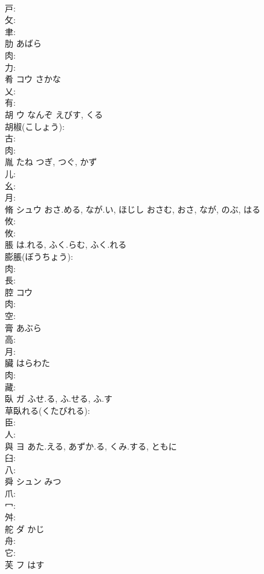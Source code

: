 \documentclass[8pt]{extreport}
\begin{document}
\begin{CJK}{UTF8}{min}
\\	戸: 
\\	攵: 
\\	聿: 
\\	肋		あばら			
\\	肉: 
\\	力: 
\\	肴	コウ	さかな		
\\	乂: 
\\	有: 
\\	胡	ウ	なんぞ	えびす, くる	
\\	胡椒(こしょう): 
\\	古: 
\\	肉: 
\\	胤		たね	つぎ, つぐ, かず		
\\	儿: 
\\	幺: 
\\	月: 
\\	脩	シュウ	おさ.める, なが.い, ほじし	おさむ, おさ, なが, のぶ, はる	
\\	攸: 
\\	攸: 
\\	脹		は.れる, ふく.らむ, ふく.れる			
\\	膨脹(ぼうちょう): 
\\	肉: 
\\	長: 
\\	腔	コウ			
\\	肉: 
\\	空: 
\\	膏		あぶら			
\\	高: 
\\	月: 
\\	臟		はらわた				
\\	肉: 
\\	藏: 
\\	臥	ガ	ふせ.る, ふ.せる, ふ.す		
\\	草臥れる(くたびれる): 
\\	臣: 
\\	人: 
\\	與	ヨ	あた.える, あずか.る, くみ.する, ともに		
\\	臼: 
\\	八: 
\\	舜	シュン		みつ	
\\	爪: 
\\	冖: 
\\	舛: 
\\	舵	ダ	かじ		
\\	舟: 
\\	它: 
\\	芙	フ		はす	

\end{CJK}
\end{document}
